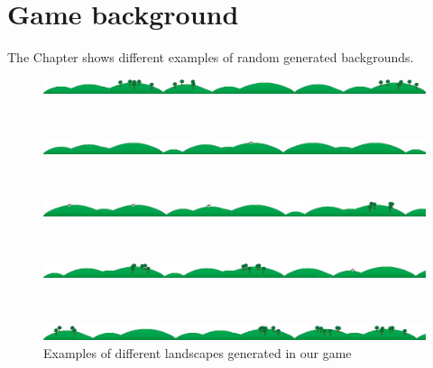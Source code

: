 \chapter{Game background}\label{app:game_background}
The Chapter shows different examples of random generated backgrounds.\\[1cm]

\begin{figure}[h]
\centering
\includegraphics[width=\textwidth, keepaspectratio]{img/screenshots/landscape1.jpg}
\end{figure}~\\

\begin{figure}[h]
\centering
\includegraphics[width=\textwidth, keepaspectratio]{img/screenshots/landscape2.jpg}
\end{figure}~\\

\begin{figure}[h]
\centering
\includegraphics[width=\textwidth, keepaspectratio]{img/screenshots/landscape3.jpg}
\end{figure}~\\

\begin{figure}[h]
\centering
\includegraphics[width=\textwidth, keepaspectratio]{img/screenshots/landscape4.jpg}
\end{figure}~\\

\begin{figure}[h!]
\centering
\includegraphics[width=\textwidth, keepaspectratio]{img/screenshots/landscape5.jpg}
\caption{Examples of different landscapes generated in our game}
\end{figure}